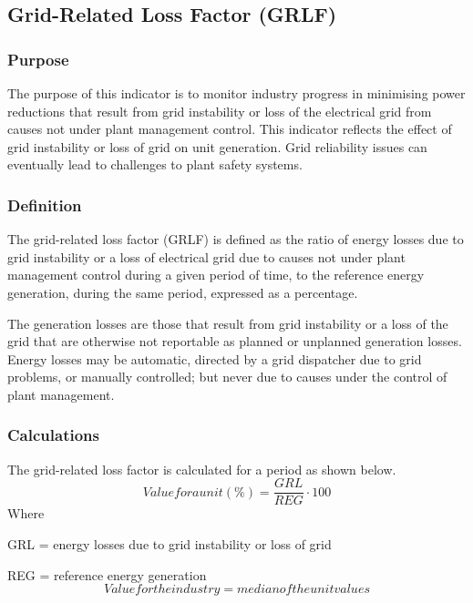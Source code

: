 \subsection{Grid-Related Loss Factor (GRLF)}

\subsubsection{Purpose}

The purpose of this indicator is to monitor industry progress in
minimising power reductions that result from grid instability or loss
of the electrical grid from causes not under plant management
control. This indicator reflects the effect of grid instability or
loss of grid on unit generation. Grid reliability issues can
eventually lead to challenges to plant safety systems.

\subsubsection{Definition}

The grid-related loss factor (GRLF) is defined as the ratio of energy
losses due to grid instability or a loss of electrical grid due to
causes not under plant management control during a given period of
time, to the reference energy generation, during the same period,
expressed as a percentage. 

The generation losses are those that result from grid instability or a
loss of the grid that are otherwise not reportable as planned or
unplanned generation losses. Energy losses may be automatic, directed
by a grid dispatcher due to grid problems, or manually controlled; but
never due to causes under the control of plant management.

\subsubsection{Calculations}

The grid-related loss factor is calculated for a period as shown below.
$$ Value for a unit (\%) = \frac{GRL}{REG} \cdot 100 $$		 
Where	

GRL = energy losses due to grid instability or loss of grid 

REG = reference energy generation 
$$ Value for the industry = median of the unit values $$